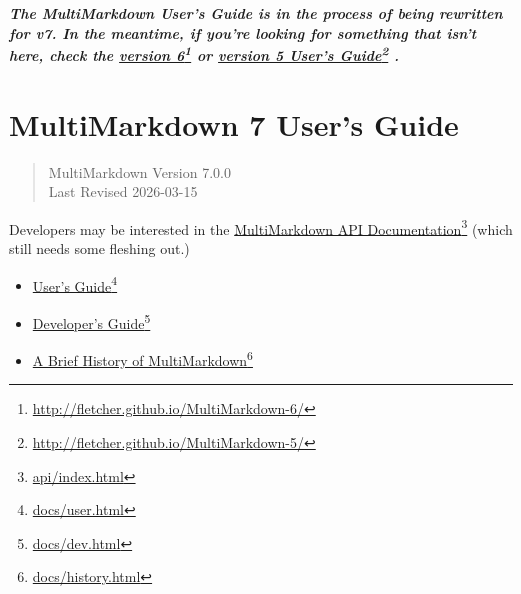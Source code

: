 
\def\mytitle{MultiMarkdown 7 User's Guide}
\def\myauthor{Fletcher T. Penney}
\def\version{7.0.0}
\def\revised{2026-03-15}


\textbf{\emph{The MultiMarkdown User's Guide is in the process of being rewritten for v7.
In the meantime, if you're looking for something that isn't here, check the
\href{http://fletcher.github.io/MultiMarkdown-6/}{version 6}\footnote{\href{http://fletcher.github.io/MultiMarkdown-6/}{http://fletcher.github.io/MultiMarkdown-6/}} or
\href{http://fletcher.github.io/MultiMarkdown-5/}{version 5 User's Guide}\footnote{\href{http://fletcher.github.io/MultiMarkdown-5/}{http://fletcher.github.io/MultiMarkdown-5/}} .}}

\chapter{MultiMarkdown 7 User's Guide}
\label{title}

\begin{quote}
MultiMarkdown Version 7.0.0\\
Last Revised 2026-03-15
\end{quote}

Developers may be interested in the \href{api/index.html}{MultiMarkdown API Documentation}\footnote{\href{api/index.html}{api/index.html}}
(which still needs some fleshing out.)

\begin{itemize}
\item \href{docs/user.html}{User's Guide}\footnote{\href{docs/user.html}{docs/user.html}}
\item \href{docs/dev.html}{Developer's Guide}\footnote{\href{docs/dev.html}{docs/dev.html}}
\item \href{docs/history.html}{A Brief History of MultiMarkdown}\footnote{\href{docs/history.html}{docs/history.html}}
\end{itemize}


